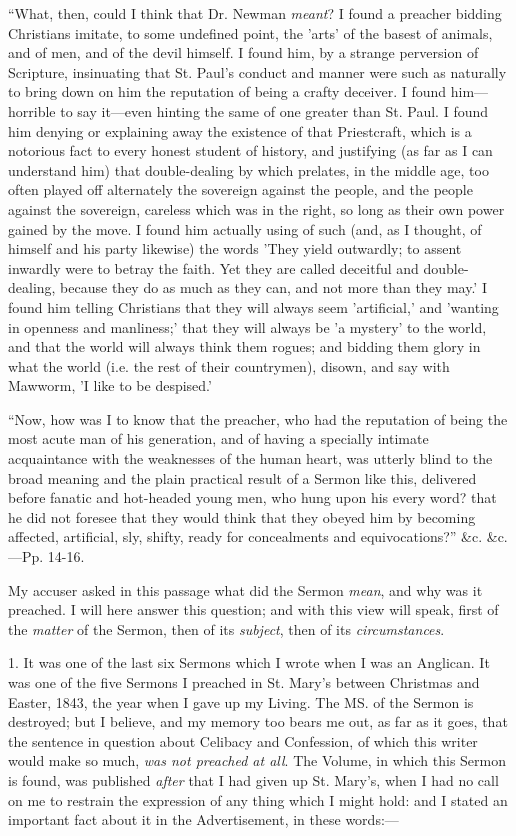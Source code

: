 ``What, then, could I think that Dr. Newman \emph{meant}? I
found a preacher bidding Christians imitate, to some undefined point,
the 'arts' of the basest of animals, and of men, and of the devil
himself. I found him, by a strange perversion of Scripture, insinuating
that St. Paul's conduct and manner were such as naturally to bring down
on him the reputation of being a crafty deceiver. I found him—horrible
to say it—even hinting the same of one greater than St. Paul. I found
him denying or explaining away the existence of that Priestcraft, which
is a notorious fact to every honest student of history, and justifying
(as far as I can understand him) that double-dealing by which prelates,
in the middle age, too often played off alternately the sovereign
against the people, and the people against the sovereign, careless which
was in the right, so long as their own power gained by the move. I found
him actually using of such (and, as I thought, of himself and his party
likewise) the words 'They yield outwardly; to assent inwardly were to
betray the faith. Yet they are called deceitful and double-dealing,
because they do as much as they can, and not more than they may.' I
found him telling Christians that they will always seem
'artificial,' and 'wanting in openness and manliness;' that they will
always be 'a mystery' to the world, and that the world will always think
them rogues; and bidding them glory in what the world (i.e. the rest of
their countrymen), disown, and say with Mawworm, 'I like to be
despised.'

``Now, how was I to know that the preacher, who had the
reputation of being the most acute man of his generation, and of having
a specially intimate acquaintance with the weaknesses of the human
heart, was utterly blind to the broad meaning and the plain practical
result of a Sermon like this, delivered before fanatic and hot-headed
young men, who hung upon his every word? that he did not foresee that
they would think that they obeyed him by becoming affected, artificial,
sly, shifty, ready for concealments and equivocations?'' \&c.
\&c.—Pp. 14-16.

My accuser asked in this passage what did the Sermon \emph{mean},
and why was it preached. I will here answer this question; and with this
view will speak, first of the \emph{matter} of the Sermon, then of its
\emph{subject}, then of its \emph{circumstances}.

1. It was one of the last six Sermons which I wrote when I was an
Anglican. It was one of the five Sermons I preached in St. Mary's
between Christmas and Easter, 1843, the year when I gave up my Living.
The MS. of the Sermon is destroyed; but I believe, and my memory too
bears me out, as far as it goes, that the sentence in question about
Celibacy and Confession, of which this writer would make so
much, \emph{was not preached at all}. The Volume, in which this
Sermon is found, was published \emph{after} that I had given up St.
Mary's, when I had no call on me to restrain the expression of any thing
which I might hold: and I stated an important fact about it in
the Advertisement, in these
words:—

